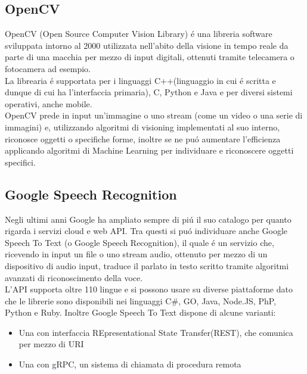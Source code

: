 \subsection{OpenCV}
OpenCV (Open Source Computer Vision Library) \'e una libreria software sviluppata intorno al 2000
utilizzata nell'abito della visione in tempo reale
da parte di una macchia per mezzo di input digitali, ottenuti tramite telecamera o fotocamera ad esempio.\\
La librearia \'e supportata per i linguaggi C++(linguaggio in cui \'e scritta e dunque di cui ha l'interfaccia primaria), C, Python e Java e
per diversi sistemi operativi, anche mobile.\\
OpenCV prede in input un'immagine o uno stream (come un video o una serie di immagini) e, utilizzando algoritmi
di visioning implementati al suo interno, riconosce oggetti o specifiche forme, inoltre se ne pu\'o aumentare l'efficienza
applicando algoritmi di Machine Learning per individuare e riconoscere oggetti specifici.

\subsection{Google Speech Recognition}
Negli ultimi anni Google ha ampliato sempre di pi\'u il suo catalogo per quanto rigarda
i servizi cloud e web API.
Tra questi si pu\'o individuare anche Google Speech To Text (o Google Speech Recognition), il quale \'e un
servizio che, ricevendo in input un file o uno stream audio, ottenuto per mezzo di un
dispositivo di audio input, traduce il parlato in testo scritto tramite algoritmi avanzati
di riconoscimento della voce.\\
L'API supporta oltre 110 lingue e si possono usare su diverse piattaforme dato che
le librerie sono disponibili nei linguaggi C\#, GO, Java, Node.JS, PhP, Python e Ruby.
Inoltre Google Speech To Text dispone di alcune varianti:
\begin{itemize}
\item Una con interfaccia REpresentational State Transfer(REST), che comunica per mezzo di URI
\item Una con gRPC, un sistema di chiamata di procedura remota
\end{itemize}

\iffalse
